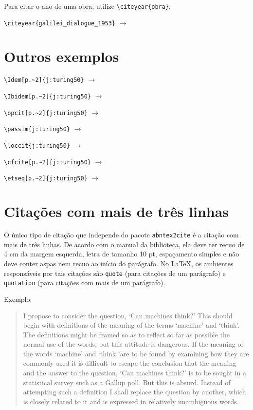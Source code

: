 \documentclass{fei}
\begin{document}
	Para citar o ano de uma obra, utilize \verb+\citeyear{obra}+.
	
	\verb+\citeyear{galilei_dialogue_1953}+ \(\to\) \citeyear{galilei_dialogue_1953}

	\section{Outros exemplos}

	\verb++ \(\to\) \Idem[p.~2]{j:turing50}

	\verb++ \(\to\) \Ibidem[p.~2]{j:turing50}

	\verb++ \(\to\) \opcit[p.~2]{j:turing50}

	\verb++ \(\to\) \passim{j:turing50}

	\verb++ \(\to\) \loccit{j:turing50}

	\verb++ \(\to\) \cfcite[p.~2]{j:turing50}

	\verb++ \(\to\) \etseq[p.~2]{j:turing50}
	
	\section{Citações com mais de três linhas}
	
	O único tipo de citação que independe do pacote \texttt{abntex2cite} é a citação com mais de três linhas. De acordo com o manual da biblioteca, ela deve ter recuo de 4 cm da margem esquerda, letra de tamanho 10 pt, espaçamento simples e não deve conter aspas nem recuo ao início do parágrafo. No \LaTeX, os ambientes responsáveis por tais citações são \texttt{quote} (para citações de um parágrafo) e \texttt{quotation} (para citações com mais de um parágrafo).
	
	Exemplo:
	
	\begin{quote}		
	I propose to consider the question, `Can machines think?' This should begin with definitions of the meaning of the terms `machine' and `think'. The definitions might be framed so as to reflect so far as possible the normal use of the words, but this attitude is dangerous. If the meaning of the words `machine' and `think 'are to be found by examining how they are commonly used it is difficult to escape the conclusion that the meaning and the answer to the question, `Can machines think?' is to be sought in a statistical survey such as a Gallup poll. But this is absurd. Instead of attempting such a definition I shall replace the question by another, which is closely related to it and is expressed in relatively unambiguous words. \cite{j:turing50}
	\end{quote}
\end{document}
